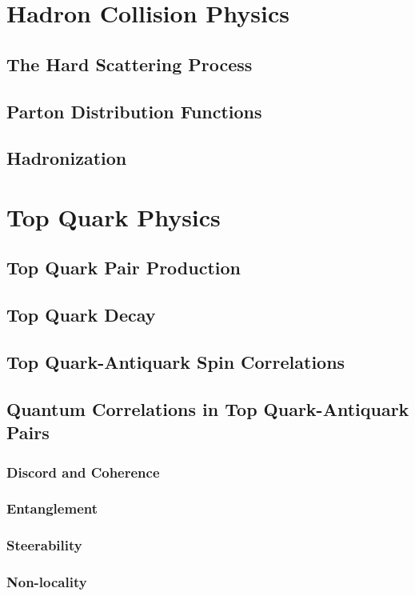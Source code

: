 \section{Hadron Collision Physics}

\subsection{The Hard Scattering Process}

\subsection{Parton Distribution Functions}

\subsection{Hadronization}

\section{Top Quark Physics}

\subsection{Top Quark Pair Production}
\label{subsec:topProduction}

\subsection{Top Quark Decay}

\subsection{Top Quark-Antiquark Spin Correlations}

\subsection{Quantum Correlations in Top Quark-Antiquark Pairs}

\subsubsection{Discord and Coherence}

\subsubsection{Entanglement}

\subsubsection{Steerability}

\subsubsection{Non-locality}